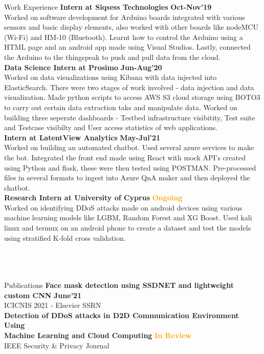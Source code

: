 \documentclass{resume}
\begin{document}
\begin{rSection}{Work Experience}
{\bf Intern at Siqsess Technologies } 
\hfill{\textbf{\textcolor{OliveGreen}{Oct-Nov'19}}} \\
Worked on software development for Arduino boards integrated with various sensors and basic display elements, also worked with other boards like nodeMCU (Wi-Fi) and HM-10 (Bluetooth). Learnt how to control the Arduino using a HTML page and an android app made using Visual Studios. Lastly,  connected the Arduino to the thingspeak to push and pull data from the cloud.\\
{\bf Data Science Intern at Prosimo} 
\hfill{\textbf{\textcolor{OliveGreen}{Jun-Aug'20}}} \\
Worked on data visualizations using Kibana with data injected into ElasticSearch. There were two stages of work involved - data injection and data visualization. Made python scripts to access AWS S3 cloud storage using BOTO3 to carry out certain data extraction taks and manipulate data. Worked on building three seperate dashboards - Testbed infrastructure visibitity, Test suite and Testcase visibilty and User access statistics of web applications.\\
{\bf Intern at LatentView Analytics} 
\hfill{\textbf{\textcolor{OliveGreen}{May-Jul'21}}} \\
Worked on building an automated chatbot. Used several azure services to make the bot. Integrated the front end  made using React with mock API's created using Python and flask, these were then tested using POSTMAN. Pre-processed files in several formats to ingest into Azure QnA maker and then deployed the chatbot.  \\
{\bf Research Intern at University of Cyprus} 
\hfill{\textbf{\textcolor{Orange}{Ongoing }}} \\
Worked on identifying DDoS attacks made on android devices using various machine learning models like LGBM, Random Forest and XG Boost. Used kali linux and termux on an android phone to create a dataset and test the models using stratified K-fold cross validation. \\\\\\\\
\end{rSection}
\begin{rSection}{Publications}
{\bf Face mask detection using SSDNET and lightweight custom CNN}
\hfill{\textbf{\textcolor{OliveGreen}{June'21}}}\\
ICICNIS 2021 - Elsevier SSRN\\
{\bf Detection of DDoS attacks in D2D Communication Environment Using\\ Machine Learning and Cloud Computing}
\hfill{\textbf{\textcolor{Orange}{In Review}}}\\
IEEE Security \& Privacy Journal
\end{rSection}
\end{document}
